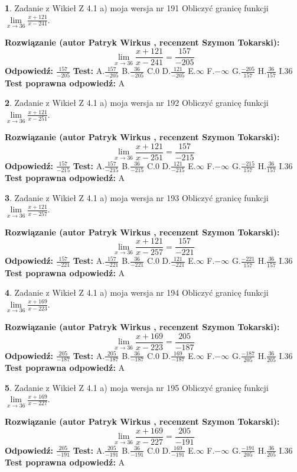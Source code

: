 \documentclass[12pt, a4paper]{article}
\theoremstyle{definition} %
\newtheorem{zad}{}
\newcommand{\zadStart}[1]{\begin{zad}#1\newline}
\newcommand{\zadStop}{\end{zad}}
\newcommand{\rozwStart}[2]{\noindent \textbf{Rozwiązanie (autor #1 , recenzent #2): }\newline}
\newcommand{\rozwStop}{\newline}
\newcommand{\odpStart}{\noindent \textbf{Odpowiedź:}\newline}
\newcommand{\odpStop}{\newline}
\newcommand{\testStart}{\noindent \textbf{Test:}\newline}
\newcommand{\testStop}{\newline}
\newcommand{\kluczStart}{\noindent \textbf{Test poprawna odpowiedź:}\newline}
\newcommand{\kluczStop}{\newline}
\begin{document}
\zadStart{Zadanie z Wikieł Z 4.1 a) moja wersja nr 191}
Obliczyć granicę funkcji $\lim\limits_{x\to36}\frac{x+121}{x-241}$.
\zadStop
\rozwStart{Patryk Wirkus}{Szymon Tokarski}
$$\lim\limits_{x\to36}\frac{x+121}{x-241} = \frac{157}{-205}$$
\rozwStop
\odpStart
$\frac{157}{-205}$
\odpStop
\testStart
A.$\frac{157}{-205}$
B.$\frac{36}{-205}$
C.$0$
D.$\frac{121}{-205}$
E.$\infty$
F.$-\infty$
G.$\frac{-205}{157}$
H.$\frac{36}{157}$
I.$36$
\testStop
\kluczStart
A
\kluczStop



\zadStart{Zadanie z Wikieł Z 4.1 a) moja wersja nr 192}
Obliczyć granicę funkcji $\lim\limits_{x\to36}\frac{x+121}{x-251}$.
\zadStop
\rozwStart{Patryk Wirkus}{Szymon Tokarski}
$$\lim\limits_{x\to36}\frac{x+121}{x-251} = \frac{157}{-215}$$
\rozwStop
\odpStart
$\frac{157}{-215}$
\odpStop
\testStart
A.$\frac{157}{-215}$
B.$\frac{36}{-215}$
C.$0$
D.$\frac{121}{-215}$
E.$\infty$
F.$-\infty$
G.$\frac{-215}{157}$
H.$\frac{36}{157}$
I.$36$
\testStop
\kluczStart
A
\kluczStop



\zadStart{Zadanie z Wikieł Z 4.1 a) moja wersja nr 193}
Obliczyć granicę funkcji $\lim\limits_{x\to36}\frac{x+121}{x-257}$.
\zadStop
\rozwStart{Patryk Wirkus}{Szymon Tokarski}
$$\lim\limits_{x\to36}\frac{x+121}{x-257} = \frac{157}{-221}$$
\rozwStop
\odpStart
$\frac{157}{-221}$
\odpStop
\testStart
A.$\frac{157}{-221}$
B.$\frac{36}{-221}$
C.$0$
D.$\frac{121}{-221}$
E.$\infty$
F.$-\infty$
G.$\frac{-221}{157}$
H.$\frac{36}{157}$
I.$36$
\testStop
\kluczStart
A
\kluczStop



\zadStart{Zadanie z Wikieł Z 4.1 a) moja wersja nr 194}
Obliczyć granicę funkcji $\lim\limits_{x\to36}\frac{x+169}{x-223}$.
\zadStop
\rozwStart{Patryk Wirkus}{Szymon Tokarski}
$$\lim\limits_{x\to36}\frac{x+169}{x-223} = \frac{205}{-187}$$
\rozwStop
\odpStart
$\frac{205}{-187}$
\odpStop
\testStart
A.$\frac{205}{-187}$
B.$\frac{36}{-187}$
C.$0$
D.$\frac{169}{-187}$
E.$\infty$
F.$-\infty$
G.$\frac{-187}{205}$
H.$\frac{36}{205}$
I.$36$
\testStop
\kluczStart
A
\kluczStop



\zadStart{Zadanie z Wikieł Z 4.1 a) moja wersja nr 195}
Obliczyć granicę funkcji $\lim\limits_{x\to36}\frac{x+169}{x-227}$.
\zadStop
\rozwStart{Patryk Wirkus}{Szymon Tokarski}
$$\lim\limits_{x\to36}\frac{x+169}{x-227} = \frac{205}{-191}$$
\rozwStop
\odpStart
$\frac{205}{-191}$
\odpStop
\testStart
A.$\frac{205}{-191}$
B.$\frac{36}{-191}$
C.$0$
D.$\frac{169}{-191}$
E.$\infty$
F.$-\infty$
G.$\frac{-191}{205}$
H.$\frac{36}{205}$
I.$36$
\testStop
\kluczStart
A
\kluczStop
\end{document}
